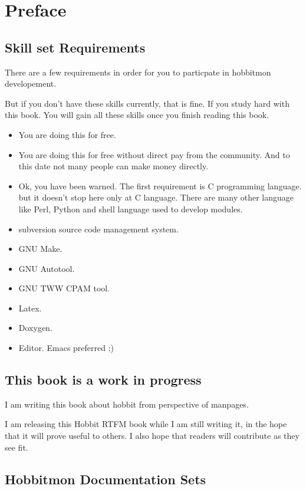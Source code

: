 \chapter{Preface}
\label{chap:preface}



\section{Skill set  Requirements }
There are a few requirements in order for you to particpate in
hobbitmon developement.

But if you don't have these skills currently, that is fine. If you
study hard with this book. You will gain all these skills once you
finish reading this book.


\begin{itemize}
\item You are doing this for free.
\item You are doing this for free without direct pay from the
  community. And to this date not many people can make money directly.

\item Ok, you have been warned. The first requirement is C programming
  language. but it doesn't stop here only at C language. There are
  many other language like Perl, Python and shell language used to
  develop modules. 
\item subversion source code management system.
\item GNU Make.
\item GNU Autotool.
\item GNU TWW CPAM tool.
\item Latex.
\item Doxygen.
\item Editor. Emacs preferred ;)
 
\end{itemize}

\section{This book is a work in progress}

I am writing this  book about hobbit from perspective of manpages.  

I am releasing this Hobbit RTFM book while I am still writing it, in the hope that
it will prove useful to others.  I also hope that readers will contribute as they see fit.

\section{Hobbitmon Documentation Sets}


